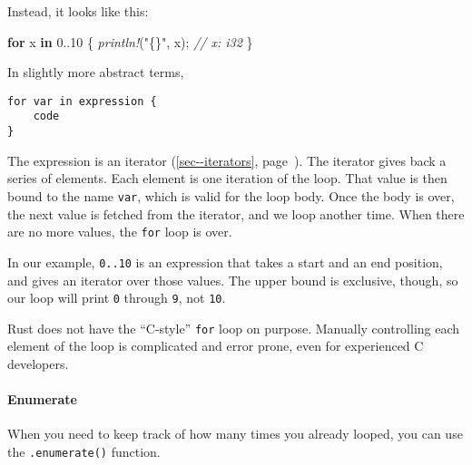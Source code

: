 \documentclass[a4paper,]{book}
\renewcommand*{\hyperref}[2][\ar]{%
  \def\ar{#2}%
  #2 (\autoref{#1}, page~\pageref{#1})}
\newenvironment{Shaded}{\begin{snugshade}}{\end{snugshade}}
\newcommand{\KeywordTok}[1]{\textcolor[rgb]{0.13,0.29,0.53}{\textbf{{#1}}}}
\newcommand{\DecValTok}[1]{\textcolor[rgb]{0.00,0.00,0.81}{{#1}}}
\newcommand{\CharTok}[1]{\textcolor[rgb]{0.31,0.60,0.02}{{#1}}}
\newcommand{\StringTok}[1]{\textcolor[rgb]{0.31,0.60,0.02}{{#1}}}
\newcommand{\CommentTok}[1]{\textcolor[rgb]{0.56,0.35,0.01}{\textit{{#1}}}}
\newcommand{\PreprocessorTok}[1]{\textcolor[rgb]{0.56,0.35,0.01}{\textit{{#1}}}}
\newcommand{\NormalTok}[1]{{#1}}
\let\oldparagraph\paragraph
\renewcommand{\paragraph}[1]{\oldparagraph{#1}\mbox{}}
\begin{document}
\begin{Shaded}
\end{Shaded}

Instead, it looks like this:

\begin{Shaded}
\begin{Highlighting}[]
\KeywordTok{for} \NormalTok{x }\KeywordTok{in} \DecValTok{0.}\NormalTok{.}\DecValTok{10} \NormalTok{\{}
    \PreprocessorTok{println!}\NormalTok{(}\StringTok{"\{\}"}\NormalTok{, x); }\CommentTok{// x: i32}
\NormalTok{\}}
\end{Highlighting}
\end{Shaded}

In slightly more abstract terms,

\begin{verbatim}
for var in expression {
    code
}
\end{verbatim}

The expression is an \hyperref[sec--iterators]{iterator}. The iterator
gives back a series of elements. Each element is one iteration of the
loop. That value is then bound to the name \texttt{var}, which is valid
for the loop body. Once the body is over, the next value is fetched from
the iterator, and we loop another time. When there are no more values,
the \texttt{for} loop is over.

In our example, \texttt{0..10} is an expression that takes a start and
an end position, and gives an iterator over those values. The upper
bound is exclusive, though, so our loop will print \texttt{0} through
\texttt{9}, not \texttt{10}.

Rust does not have the ``C-style'' \texttt{for} loop on purpose.
Manually controlling each element of the loop is complicated and error
prone, even for experienced C developers.

\paragraph{Enumerate}\label{enumerate}

When you need to keep track of how many times you already looped, you
can use the \texttt{.enumerate()} function.
\end{document}
